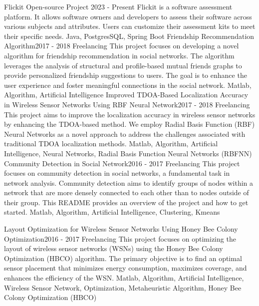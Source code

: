 
\begin{projects}
	\project
	{Flickit Open-source Project} {2023 - Present}
	{}
	{Flickit is a software assessment platform. It allows software owners and developers to assess their software across various subjects and attributes. Users can customize their assessment kits to meet their specific needs.}
	{Java, PostgresSQL, Spring Boot}
	\project
	{Friendship Recommendation Algorithm}{2017 - 2018}
	{ {Freelancing}}
	{This project focuses on developing a novel algorithm for friendship recommendation in social networks. The algorithm leverages the analysis of structural and profile-based mutual friends graphs to provide personalized friendship suggestions to users. The goal is to enhance the user experience and foster meaningful connections in the social network.}
	{Matlab, Algorithm, Artificial Intelligence}
	\newpage
	\project
	{Improved TDOA-Based Localization Accuracy in Wireless Sensor Networks Using RBF Neural Network}{2017 - 2018}
	{ {Freelancing} }
	{This project aims to improve the localization accuracy in wireless sensor networks by enhancing the TDOA-based method. We employ Radial Basis Function (RBF) Neural Networks as a novel approach to address the challenges associated with traditional TDOA localization methods.}
	{Matlab, Algorithm, Artificial Intelligence, Neural Networks, Radial Basis Function Neural Networks (RBFNN)}
	\project
	{Community Detection in Social Network}{2016 - 2017}
	{ {Freelancing} }
	{This project focuses on community detection in social networks, a fundamental task in network analysis. Community detection aims to identify groups of nodes within a network that are more densely connected to each other than to nodes outside of their group. This README provides an overview of the project and how to get started.}
	{Matlab, Algorithm, Artificial Intelligence, Clustering, Kmeans}

	\project
	{Layout Optimization for Wireless Sensor Networks Using Honey Bee Colony Optimization}{2016 - 2017}
	{ {Freelancing} }
	{This project focuses on optimizing the layout of wireless sensor networks (WSNs) using the Honey Bee Colony Optimization (HBCO) algorithm. The primary objective is to find an optimal sensor placement that minimizes energy consumption, maximizes coverage, and enhances the efficiency of the WSN.}
	{Matlab, Algorithm, Artificial Intelligence, Wireless Sensor Network, Optimization, Metaheuristic Algorithm, Honey Bee Colony Optimization (HBCO)}


\end{projects}
